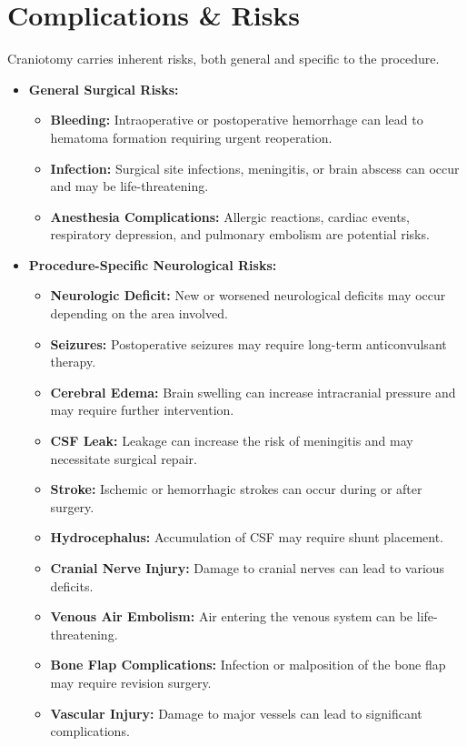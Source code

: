 \section*{Complications \& Risks}
Craniotomy carries inherent risks, both general and specific to the procedure.

\begin{itemize}
  \item \textbf{General Surgical Risks:}
    \begin{itemize}
      \item \textbf{Bleeding:} Intraoperative or postoperative hemorrhage can lead to hematoma formation requiring urgent reoperation.
      \item \textbf{Infection:} Surgical site infections, meningitis, or brain abscess can occur and may be life-threatening.
      \item \textbf{Anesthesia Complications:} Allergic reactions, cardiac events, respiratory depression, and pulmonary embolism are potential risks.
    \end{itemize}
  
  \item \textbf{Procedure-Specific Neurological Risks:}
    \begin{itemize}
      \item \textbf{Neurologic Deficit:} New or worsened neurological deficits may occur depending on the area involved.
      \item \textbf{Seizures:} Postoperative seizures may require long-term anticonvulsant therapy.
      \item \textbf{Cerebral Edema:} Brain swelling can increase intracranial pressure and may require further intervention.
      \item \textbf{CSF Leak:} Leakage can increase the risk of meningitis and may necessitate surgical repair.
      \item \textbf{Stroke:} Ischemic or hemorrhagic strokes can occur during or after surgery.
      \item \textbf{Hydrocephalus:} Accumulation of CSF may require shunt placement.
      \item \textbf{Cranial Nerve Injury:} Damage to cranial nerves can lead to various deficits.
      \item \textbf{Venous Air Embolism:} Air entering the venous system can be life-threatening.
      \item \textbf{Bone Flap Complications:} Infection or malposition of the bone flap may require revision surgery.
      \item \textbf{Vascular Injury:} Damage to major vessels can lead to significant complications.
    \end{itemize}
\end{itemize}

